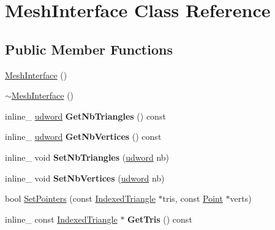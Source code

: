 \hypertarget{class_mesh_interface}{\section{Mesh\+Interface Class Reference}
\label{class_mesh_interface}
}
\subsection*{Public Member Functions}
\begin{DoxyCompactItemize}
\item 
\hyperlink{class_mesh_interface_aba590ec6ec5432322174b1450745f808}{Mesh\+Interface} ()
\item 
\hyperlink{class_mesh_interface_abb1a0da3ced5e305f059d66b289a1f85}{$\sim$\+Mesh\+Interface} ()
\item 
\hypertarget{class_mesh_interface_a166fa0dd2932406c1662f11308d143f0}{inline\+\_\+ \hyperlink{_ice_types_8h_a44c6f1920ba5551225fb534f9d1a1733}{udword} {\bfseries Get\+Nb\+Triangles} () const }\label{class_mesh_interface_a166fa0dd2932406c1662f11308d143f0}

\item 
\hypertarget{class_mesh_interface_a9f4e57faca3d41acb1e595f221b71769}{inline\+\_\+ \hyperlink{_ice_types_8h_a44c6f1920ba5551225fb534f9d1a1733}{udword} {\bfseries Get\+Nb\+Vertices} () const }\label{class_mesh_interface_a9f4e57faca3d41acb1e595f221b71769}

\item 
\hypertarget{class_mesh_interface_abfd3284e03432fe0fefe895b79df6cdf}{inline\+\_\+ void {\bfseries Set\+Nb\+Triangles} (\hyperlink{_ice_types_8h_a44c6f1920ba5551225fb534f9d1a1733}{udword} nb)}\label{class_mesh_interface_abfd3284e03432fe0fefe895b79df6cdf}

\item 
\hypertarget{class_mesh_interface_a5f9a5aae4efcd8d21a174fedbdcbfcf7}{inline\+\_\+ void {\bfseries Set\+Nb\+Vertices} (\hyperlink{_ice_types_8h_a44c6f1920ba5551225fb534f9d1a1733}{udword} nb)}\label{class_mesh_interface_a5f9a5aae4efcd8d21a174fedbdcbfcf7}

\item 
bool \hyperlink{class_mesh_interface_a4810ebe4cad5b7ff08ca26187fa1c301}{Set\+Pointers} (const \hyperlink{class_indexed_triangle}{Indexed\+Triangle} $\ast$tris, const \hyperlink{class_point}{Point} $\ast$verts)
\item 
\hypertarget{class_mesh_interface_a5c3594184da578eee7b7163453bf0269}{inline\+\_\+ const \hyperlink{class_indexed_triangle}{Indexed\+Triangle} $\ast$ {\bfseries Get\+Tris} () const }\label{class_mesh_interface_a5c3594184da578eee7b7163453bf0269}


\end{DoxyCompactItemize}
